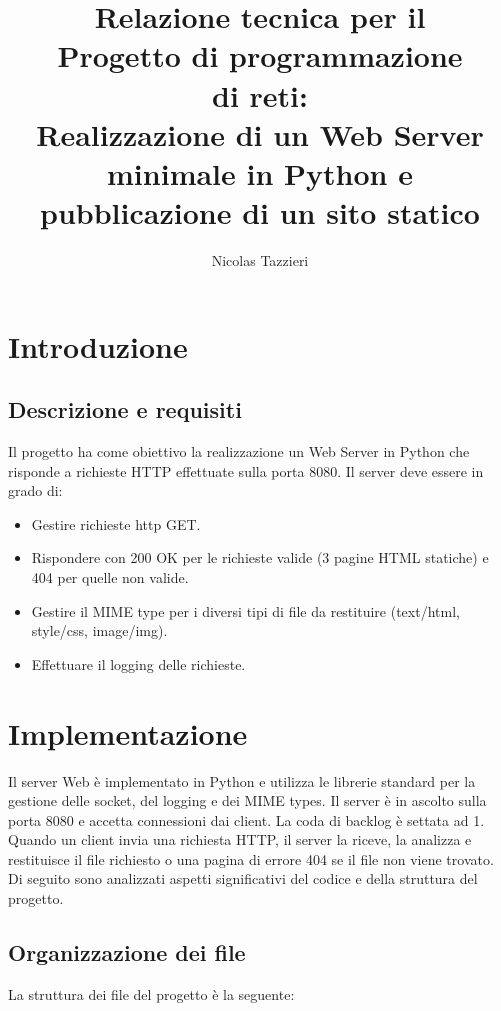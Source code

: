 \documentclass[a4paper,12pt]{report}
\title{\Huge \textbf{Relazione tecnica per il \\ Progetto di programmazione \\ di reti:\\}
\vspace{0.5cm}
\LARGE Realizzazione di un Web Server minimale in Python e pubblicazione di un sito statico
}
\author{
    Nicolas Tazzieri
}
\begin{document}
\maketitle

\newpage

\tableofcontents

\chapter{Introduzione}

\section{Descrizione e requisiti}

Il progetto ha come obiettivo la realizzazione un Web Server in Python che risponde a richieste HTTP effettuate sulla porta 8080. Il server deve essere in grado di:
\begin{itemize}
    \item Gestire richieste http GET.
    \item Rispondere con 200 OK per le richieste valide (3 pagine HTML statiche) e 404 per quelle non valide.
    \item Gestire il MIME type per i diversi tipi di file da restituire (text/html, style/css, image/img).
    \item Effettuare il logging delle richieste.
\end{itemize}


\chapter{Implementazione}

Il server Web è implementato in Python e utilizza le librerie standard per la gestione delle socket, del logging e dei MIME types. Il server è in ascolto sulla porta 8080 e accetta connessioni dai client. La coda di backlog è settata ad 1. Quando un client invia una richiesta HTTP, il server la riceve, la analizza e restituisce il file richiesto o una pagina di errore 404 se il file non viene trovato. Di seguito sono analizzati aspetti significativi del codice e della struttura del progetto.

\section{Organizzazione dei file}
La struttura dei file del progetto è la seguente:
\end{document}
